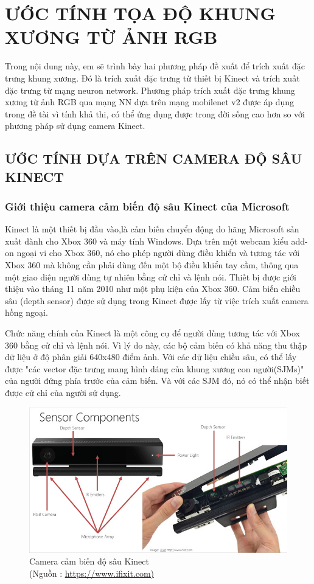 \chapter{ƯỚC TÍNH TỌA ĐỘ KHUNG XƯƠNG TỪ ẢNH RGB}
\label{s:pose estimate}
Trong nội dung này, em sẽ trình bày hai phương pháp đề xuất để trích xuất đặc trưng khung xương. Đó là trích xuất đặc trưng từ thiết bị Kinect và trích xuất đặc trưng từ mạng neuron network. Phương pháp trích xuất đặc trưng khung xương từ ảnh RGB qua mạng NN dựa trên mạng mobilenet v2 được áp dụng trong đề tài vì tính khả thi, có thể ứng dụng được trong đời sống cao hơn so với phương pháp sử dụng camera Kinect.

\section{ƯỚC TÍNH DỰA TRÊN CAMERA ĐỘ SÂU KINECT}
\label{ss:kinect}
\subsection{Giới thiệu camera cảm biến độ sâu Kinect của Microsoft}
Kinect là một thiết bị đầu vào,là cảm biến chuyển động do hãng Microsoft sản xuất dành cho Xbox 360 và máy tính Windows. Dựa trên một webcam kiểu add-on ngoại vi cho Xbox 360, nó cho phép người dùng điều khiển và tương tác với Xbox 360 mà không cần phải dùng đến một bộ điều khiển tay cầm, thông qua một giao diện người dùng tự nhiên bằng cử chỉ và lệnh nói. Thiết bị được giới thiệu vào tháng 11 năm 2010 như một phụ kiện của Xbox 360. Cảm biến chiều sâu (depth sensor) được sử dụng trong Kinect được lấy từ việc trích xuất camera hồng ngoại. 

Chức năng chính của Kinect là một công cụ để người dùng tương tác với Xbox 360 bằng cử chỉ và lệnh nói. Vì lý do này, các bộ cảm biến có khả năng thu thập dữ liệu ở độ phân giải 640x480 điểm ảnh. Với các dữ liệu chiều sâu, có thể lấy được "các vector đặc trưng mang hình dáng của khung xương con người(SJMs)" của người đứng phía trước của cảm biến. Và với các SJM đó, nó có thể nhận biết được cử chỉ của người sử dụng.

\FloatBarrier
\begin{figure}[htp]
\begin{center}
\includegraphics[scale=0.8]{chap3/c3_figs/kinect.png}
\end{center}
\caption{Camera cảm biến độ sâu Kinect \\(Nguồn : \url{https://www.ifixit.com)}}
\label{fig:kinect}
\end{figure}
\FloatBarrier

